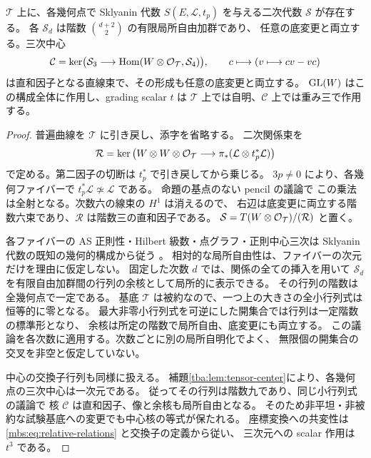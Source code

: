 \begin{lemma}[普遍二次代数と普遍三次中心]
\label{mbs:lem:factor-family}
$\mathcal T$ 上に、各幾何点で Sklyanin 代数
$S(E,\mathcal L,t_p)$ を与える二次代数 $\mathcal S$ が存在する。
各 $\mathcal S_d$ は階数 $\binom{d+2}{2}$ の有限局所自由加群であり、
任意の底変更と両立する。三次中心
\[
 \mathcal C=\ker\bigl(\mathcal S_3
      \longrightarrow\operatorname{Hom}(W\otimes\mathcal O_{\mathcal T},\mathcal S_4)\bigr),
 \qquad c\longmapsto(v\longmapsto cv-vc)
\]
は直和因子となる直線束で、その形成も任意の底変更と両立する。
$\operatorname{GL}(W)$ はこの構成全体に作用し、grading scalar $t$ は
$\mathcal T$ 上では自明、$\mathcal C$ 上では重み三で作用する。
\end{lemma}
\begin{proof}
普遍曲線を $\mathcal T$ に引き戻し、添字を省略する。
二次関係束を
\begin{equation}\label{mbs:eq:relative-relations}
 \mathcal R=\ker\left(
 W\otimes W\otimes\mathcal O_{\mathcal T}
 \longrightarrow\pi_*(\mathcal L\otimes t_p^*\mathcal L)\right)
\end{equation}
で定める。第二因子の切断は $t_p^*$ で引き戻してから乗じる。
$3p\ne0$ により、各幾何ファイバーで
$t_p^*\mathcal L\not\simeq\mathcal L$ である。
命題の基点のない pencil の議論で
この乗法は全射となる。次数六の線束の $H^1$ は消えるので、
右辺は底変更に両立する階数六束であり、$\mathcal R$ は階数三の直和因子である。
$\mathcal S=T(W\otimes\mathcal O_{\mathcal T})/(\mathcal R)$ と置く。

各ファイバーの AS 正則性・Hilbert 級数・点グラフ・正則中心三次は
Sklyanin 代数の既知の幾何的構成から従う
\cite[Theorems~6.6, 6.8]{GRSklyaninATV}
\cite[\S1, pp.~20--21]{GRSklyaninST}。
相対的な局所自由性は、ファイバーの次元だけを理由に仮定しない。
固定した次数 $d$ では、関係の全ての挿入を用いて
$\mathcal S_d$ を有限自由加群間の行列の余核として局所的に表示できる。
その行列の階数は全幾何点で一定である。
基底 $\mathcal T$ は被約なので、一つ上の大きさの全小行列式は恒等的に零となる。
最大非零小行列式を可逆にした開集合では行列は一定階数の標準形となり、
余核は所定の階数で局所自由、底変更にも両立する。
この議論を各次数に適用する。次数ごとに別の局所自明化でよく、
無限個の開集合の交叉を非空と仮定していない。

中心の交換子行列も同様に扱える。
補題\ref{tba:lem:tensor-center}により、各幾何点の三次中心は一次元である。
従ってその行列は階数九であり、同じ小行列式の議論で
核 $\mathcal C$ は直和因子、像と余核も局所自由となる。
そのため非平坦・非被約な試験基底への変更でも中心核の等式が保たれる。
座標変換への共変性は \eqref{mbs:eq:relative-relations} と交換子の定義から従い、
三次元への scalar 作用は $t^3$ である。
\end{proof}

